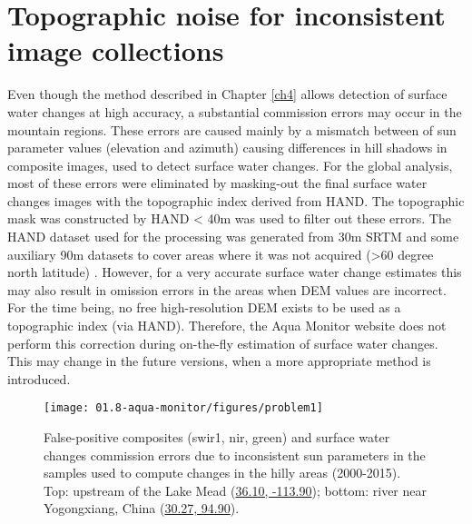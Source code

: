 

\section{Topographic noise for inconsistent image collections}
Even though the method described in Chapter \ref{ch4} allows detection of surface water changes at high accuracy, a substantial commission errors may occur in the mountain regions. These errors are caused mainly by a mismatch between of sun parameter values (elevation and azimuth) causing differences in hill shadows in composite images, used to detect surface water changes. For the global analysis, most of these errors were eliminated by masking-out the final surface water changes images with the topographic index derived from HAND. The topographic mask was constructed by  HAND < 40m was used to filter out these errors. The HAND dataset used for the processing was generated from 30m SRTM and some auxiliary 90m datasets to cover areas where it was not acquired (>60 degree north latitude) \citet{donchyts2016hand}. However, for a very accurate surface water change estimates this may also result in omission errors in the areas when DEM values are incorrect. For the time being, no free high-resolution DEM exists to be used as a topographic index (via HAND). Therefore, the Aqua Monitor website does not perform this correction during on-the-fly estimation of surface water changes. This may change in the future versions, when a more appropriate method is introduced.

\begin{figure}
	\centering
	\texttt{[image: 01.8-aqua-monitor/figures/problem1]}
	\caption{False-positive composites (swir1, nir, green) and surface water changes commission errors due to inconsistent sun parameters in the samples used to compute changes in the hilly areas (2000-2015). Top: upstream of the Lake Mead (\href{http://aqua-monitor.appspot.com/?from=2000&to=2013&view=36.103119715292486,-113.93795967102045,13z&max_doy=365}{36.10, -113.90}); bottom: river near Yogongxiang, China (\href{http://aqua-monitor.appspot.com/?mode=dynamic&from=2000&to=2013&view=30.269128374988604,94.89677429199217,12z&max_doy=365&averaging_months1=36&averaging_months2=36}{30.27, 94.90}).}
	\label{fig:am-topographic-errors}
\end{figure}


